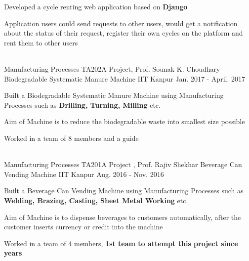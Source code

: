\begin{cventries}
{\begin{cvitems}
        \item {Developed a cycle renting web application based on \textbf{Django}}
        \item{Application users could send requests to other users, would get a notification about the status of their request, register their own cycles on the platform and rent them to other users}
      \end{cvitems}
    }\\
    \vspace{2mm}
    \cventry
    {Manufacturing Processes TA202A Project, Prof. Sounak K. Choudhary}
    {Biodegradable Systematic Manure Machine}
    {IIT Kanpur}
    {Jan. 2017 - April. 2017}
    {
      \begin{cvitems}
        \item {Built a Biodegradable Systematic Manure Machine using Manufacturing Processes such as \textbf{Drilling, Turning, Milling} etc.}
        \item {Aim of Machine is to reduce the biodegradable waste into smallest size possible}
        \item {Worked in a team of 8 members and a guide}
      \end{cvitems}
    }\\
    \vspace{2mm}
    \cventry
    {Manufacturing Processes TA201A Project , Prof. Rajiv Shekhar}
    {Beverage Can Vending Machine}
    {IIT Kanpur}
    {Aug. 2016 - Nov. 2016}
    {
      \begin{cvitems}
        \item {Built a Beverage Can Vending Machine using Manufacturing Processes such as \textbf{Welding, Brazing, Casting, Sheet Metal Working} etc.}
        \item {Aim of Machine is to dispense beverages to customers automatically, after the customer inserts currency or credit into the machine}
        \item {Worked in a team of 4 members, \textbf{1st team to attempt this project since years}}
      \end{cvitems}
    }
\end{cventries}
